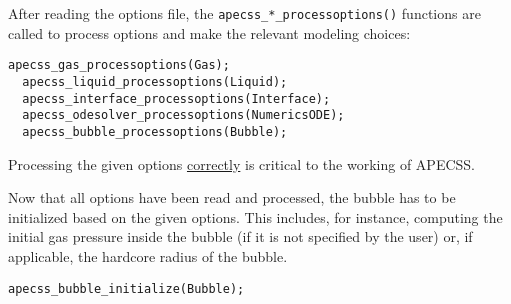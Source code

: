 After reading the options file, the {\tt apecss\_*\_processoptions()} functions are called to process options and make the relevant modeling choices:
\begin{lstlisting}[style=CStyle,numbers=none]
  apecss_gas_processoptions(Gas);
  apecss_liquid_processoptions(Liquid);
  apecss_interface_processoptions(Interface);
  apecss_odesolver_processoptions(NumericsODE);
  apecss_bubble_processoptions(Bubble);
\end{lstlisting}\vspace{-0.75em}
Processing the given options \uline{correctly} is critical to the working of APECSS.

Now that all options have been read and processed, the bubble has to be initialized based on the given options. This includes, for instance, computing the initial gas pressure inside the bubble (if it is not specified by the user) or, if applicable, the hardcore radius of the bubble.
\begin{lstlisting}[style=CStyle,numbers=none]
  apecss_bubble_initialize(Bubble);
\end{lstlisting}

